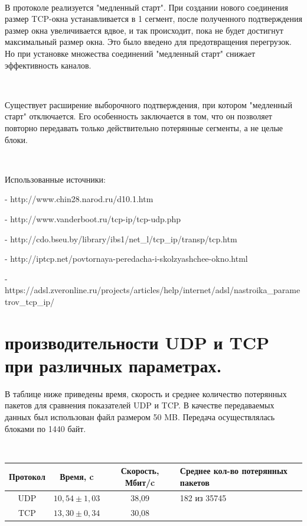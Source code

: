 \documentclass{article}
\begin{document}
~\

В протоколе реализуется "медленный старт". При создании нового соединения размер TCP-окна устанавливается в 1 сегмент, после полученного подтверждения размер окна увеличивается вдвое, и так происходит, пока не будет достигнут максимальный размер окна. Это было введено для предотвращения перегрузок. Но при установке множества соединений "медленный старт" снижает эффективность каналов.

~\

Существует расширение выборочного подтверждения, при котором "медленный старт" отключается. Его особенность заключается в том, что он позволяет повторно передавать только действительно потерянные сегменты, а не целые блоки.

~\

Использованные источники:

- http://www.chin28.narod.ru/d10.1.htm 

- http://www.vanderboot.ru/tcp-ip/tcp-udp.php

- http://cdo.bseu.by/library/ibs1/net\_l/tcp\_ip/transp/tcp.htm

- http://iptcp.net/povtornaya-peredacha-i-skolzyashchee-okno.html

-https://adsl.zveronline.ru/projects/articles/help/internet/adsl/nastroika\_parametrov\_tcp\_ip/

\newpage

\section{\textbf{ производительности UDP и TCP при различных параметрах.}}

В таблице ниже приведены время, скорость и среднее количество потерянных пакетов для сравнения показателей UDP и TCP. В качестве передаваемых данных был использован файл размером 50 MB. Передача осуществлялась блоками по 1440 байт.

~\

\begin{table}[h]
\begin{tabular}{|c|c|c|p{130pt}|}
\hline
Протокол & Время, c & Скорость, Мбит/c & Среднее кол-во потерянных пакетов \\
\hline
UDP & $10,54 \pm 1,03$ & 38,09 & 182 из 35745\\
TCP & $13,30 \pm 0,34$ & 30,08 &  \\
\hline
\end{tabular}
\end{table}
\end{document}
